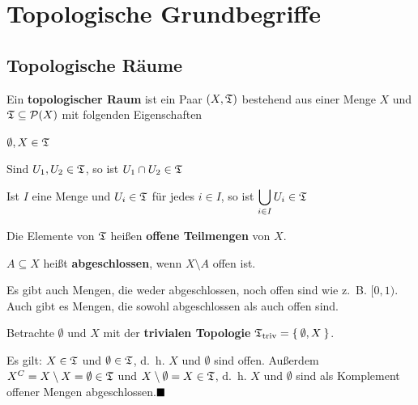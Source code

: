 \chapter{Topologische Grundbegriffe}
\section{Topologische Räume}
\begin{definition}%
    Ein \textbf{topologischer Raum} ist ein Paar $(X, \mathfrak{T})$ bestehend
    aus einer Menge $X$ und $\mathfrak{T} \subseteq \mathcal{P}(X)$ mit
    folgenden Eigenschaften
    \begin{defenumprops}
        \item $\emptyset, X \in \mathfrak{T}$
        \item \label{def:topologie.ii} Sind $U_1, U_2 \in \mathfrak{T}$, so ist $U_1 \cap U_2 \in \mathfrak{T}$
        \item Ist $I$ eine Menge und $U_i \in \mathfrak{T}$ für jedes $i \in I$,
              so ist $\displaystyle \bigcup_{i \in I} U_i \in \mathfrak{T}$
    \end{defenumprops}
    Die Elemente von $\mathfrak{T}$ heißen \textbf{offene Teilmengen} von $X$. 

    $A \subseteq X$ heißt \textbf{abgeschlossen}, wenn $X \setminus A$ offen ist.
\end{definition}

Es gibt auch Mengen, die weder abgeschlossen, noch offen sind wie z.~B. $[0,1)$.
Auch gibt es Mengen, die sowohl abgeschlossen als auch offen sind.

\begin{bemerkung}%
    Betrachte $\emptyset$ und $X$ mit der \textbf{trivialen Topologie}
     $\mathfrak{T}_{\textnormal{triv}} = \Set{\emptyset, X}$.

    Es gilt: $X \in \mathfrak{T}$ und $\emptyset \in \mathfrak{T}$, d.~h. $X$ und $\emptyset$
    sind offen. Außerdem $X^C = X \setminus X = \emptyset \in \mathfrak{T}$
    und $X \setminus \emptyset = X \in \mathfrak{T}$, d.~h. $X$ und $\emptyset$
    sind als Komplement offener Mengen abgeschlossen.$\qed$
\end{bemerkung}

